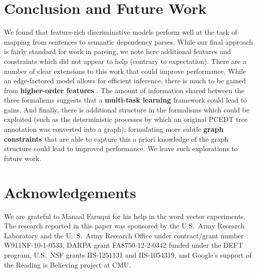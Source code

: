 \documentclass[11pt]{article}
\begin{document}
\section{Conclusion and Future Work}
We found that feature-rich discriminative models perform well at the task of
mapping from sentences to semantic dependency parses. 
While our final approach is fairly standard for work in parsing, we
note here additional features and constraints which did not
appear to help (contrary to expectation).
There are a number of clear extensions to this work that could improve
performance.
While an edge-factored model allows for efficient inference, there is
much to be gained from \textbf{higher-order features}
\citep{mcdonald_online_2006,martins_turning_2013}.
The amount of information
shared between the three formalisms suggests that a \textbf{multi-task learning}
\cite{evgeniou_regularized_2004} framework could lead to gains.
And finally, there is additional structure in the formalisms which could be
exploited (such as the deterministic processes by which an original PCEDT tree annotation was converted into a graph); formulating more subtle \textbf{graph constraints} that are able to capture this a priori
knowledge of the graph structure could lead to improved performance.  We leave such explorations to future work.



\small
\section*{Acknowledgements}
We are grateful to Manaal Faruqui for his help in the word vector experiments.
The research reported in this paper was sponsored by the U.S.~Army Research
Laboratory and the U.~S.~Army Research Office under contract/grant number
W911NF-10-1-0533, DARPA grant FA8750-12-2-0342 funded under the DEFT
program, U.S.~NSF grants IIS-1251131 and IIS-1054319, and Google's
support of the Reading is Believing project at CMU.




\end{document}

